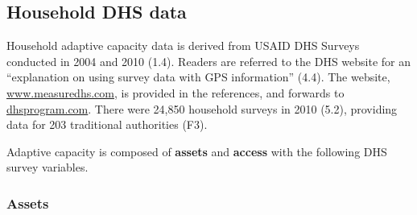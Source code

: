\documentclass[
]{article}
\begin{document}
\hypertarget{household-dhs-data}{%
\subsection{Household DHS data}\label{household-dhs-data}}

Household adaptive capacity data is derived from USAID DHS Surveys
conducted in 2004 and 2010 (1.4). Readers are referred to the DHS
website for an ``explanation on using survey data with GPS information''
(4.4). The website,
\href{http://www.measuredhs.com}{www.measuredhs.com}, is provided in the
references, and forwards to
\href{https://dhsprogram.com}{dhsprogram.com}. There were 24,850
household surveys in 2010 (5.2), providing data for 203 traditional
authorities (F3).

Adaptive capacity is composed of \textbf{assets} and \textbf{access}
with the following DHS survey variables.

\hypertarget{assets}{%
\subsubsection{Assets}\label{assets}}
\end{document}
